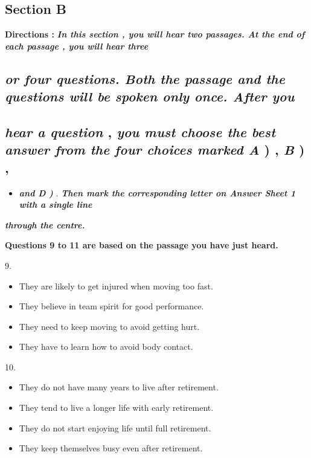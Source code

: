 \documentclass[UTF8,11pt]{ctexart}
\begin{document}
\subsection*{\textbf{Section B}}


\textbf{Directions : }\textbf{\textit{In this section , you will hear two passages. At the end of each passage , you will hear three}}


\subsection*{\textbf{\textit{or four questions. Both the passage and the questions will be spoken only once. After you}}}


\subsection*{\textbf{\textit{hear a question }}, \textbf{\textit{you must choose the best answer from the four choices marked A }}) , \textbf{\textit{B }}) ,}


\begin{itemize}[leftmargin=2em,itemsep=.2em,topsep=.4em]\item[C.] \textbf{\textit{and D ) }}. \textbf{\textit{Then mark the corresponding letter on Answer Sheet 1 with a single line}}
\end{itemize}

\textbf{\textit{through the centre.}}


\textbf{Questions 9 to 11 are based on the passage you have just heard.}


9.


\begin{itemize}[leftmargin=2em,itemsep=.2em,topsep=.4em]\item[A.] They are likely to get injured when moving too fast.
\item[B.] They believe in team spirit for good performance.
\item[C.] They need to keep moving to avoid getting hurt.
\item[D.] They have to learn how to avoid body contact.
\end{itemize}

10.


\begin{itemize}[leftmargin=2em,itemsep=.2em,topsep=.4em]\item[A.] They do not have many years to live after retirement.
\item[B.] They tend to live a longer life with early retirement.
\item[C.] They do not start enjoying life until full retirement.
\item[D.] They keep themselves busy even after retirement.
\end{itemize}
\end{document}
